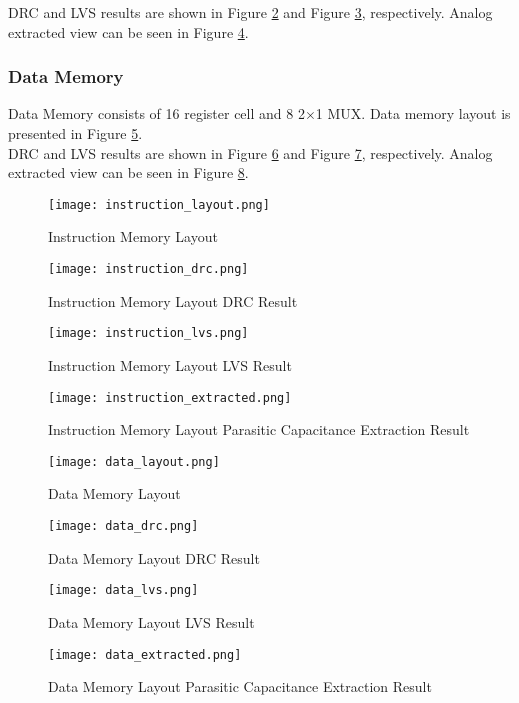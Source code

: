\documentclass[12pt]{article}
\begin{document}
DRC and LVS results are shown in Figure \ref{instruction_drc} and Figure \ref{instruction_lvs}, respectively. Analog extracted view can be seen in Figure \ref{instruction_extracted}.


\subsubsection*{Data Memory}

Data Memory consists of 16 register cell and 8 2$\times$1 MUX. Data memory layout is presented in Figure \ref{data_lay}. \\

DRC and LVS results are shown in Figure \ref{data_drc} and Figure \ref{data_lvs}, respectively. Analog extracted view can be seen in Figure \ref{data_extracted}.

\begin{landscape}
\pagestyle{empty}

\begin{figure}[H]
\centering
\texttt{[image: instruction\_layout.png]}
\caption{Instruction Memory Layout}
\label{instruction_lay}
\end{figure}

\begin{figure}[H]
\centering
\texttt{[image: instruction\_drc.png]}
\caption{Instruction Memory Layout DRC Result}
\label{instruction_drc}
\end{figure}


\begin{figure}[H]
\centering
\texttt{[image: instruction\_lvs.png]}
\caption{Instruction Memory Layout LVS Result}
\label{instruction_lvs}
\end{figure}

\begin{figure}[H]
\centering
\texttt{[image: instruction\_extracted.png]}
\caption{Instruction Memory Layout Parasitic Capacitance Extraction Result}
\label{instruction_extracted}
\end{figure}

\begin{figure}[H]
\centering
\texttt{[image: data\_layout.png]}
\caption{Data Memory Layout}
\label{data_lay}
\end{figure}

\begin{figure}[H]
\centering
\texttt{[image: data\_drc.png]}
\caption{Data Memory Layout DRC Result}
\label{data_drc}
\end{figure}


\begin{figure}[H]
\centering
\texttt{[image: data\_lvs.png]}
\caption{Data Memory Layout LVS Result}
\label{data_lvs}
\end{figure}

\begin{figure}[H]
\centering
\texttt{[image: data\_extracted.png]}
\caption{Data Memory Layout Parasitic Capacitance Extraction Result}
\label{data_extracted}
\end{figure}

\end{landscape}
\end{document}
